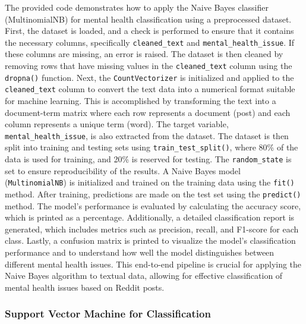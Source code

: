 \noindent
The provided code demonstrates how to apply the Naive Bayes classifier (MultinomialNB) for mental health classification using a preprocessed dataset. First, the dataset is loaded, and a check is performed to ensure that it contains the necessary columns, specifically \texttt{cleaned\_text} and \texttt{mental\_health\_issue}. If these columns are missing, an error is raised. The dataset is then cleaned by removing rows that have missing values in the \texttt{cleaned\_text} column using the \texttt{dropna()} function. Next, the \texttt{CountVectorizer} is initialized and applied to the \texttt{cleaned\_text} column to convert the text data into a numerical format suitable for machine learning. This is accomplished by transforming the text into a document-term matrix where each row represents a document (post) and each column represents a unique term (word). The target variable, \texttt{mental\_health\_issue}, is also extracted from the dataset. The dataset is then split into training and testing sets using \texttt{train\_test\_split()}, where 80\% of the data is used for training, and 20\% is reserved for testing. The \texttt{random\_state} is set to ensure reproducibility of the results. A Naive Bayes model (\texttt{MultinomialNB}) is initialized and trained on the training data using the \texttt{fit()} method. After training, predictions are made on the test set using the \texttt{predict()} method. The model's performance is evaluated by calculating the accuracy score, which is printed as a percentage. Additionally, a detailed classification report is generated, which includes metrics such as precision, recall, and F1-score for each class. Lastly, a confusion matrix is printed to visualize the model's classification performance and to understand how well the model distinguishes between different mental health issues. This end-to-end pipeline is crucial for applying the Naive Bayes algorithm to textual data, allowing for effective classification of mental health issues based on Reddit posts.


\subsubsection{Support Vector Machine for Classification}

